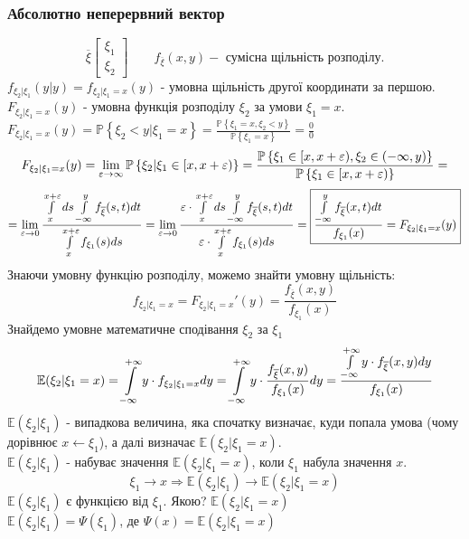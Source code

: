 \subsubsection{Абсолютно неперервний вектор}
$$
\overline{\xi}  \begin{bmatrix}
 \xi_1 \\ \xi_2
\end{bmatrix} \qquad f_{\overline{\xi}} (x,y) - \text{ сумісна щільність розподілу.}
$$
$
f_{\xi_2 | \xi_1} (y|y) = f_{\xi_2| \xi_1 = x} (y)
$ - умовна щільність другої координати за першою.\\

$F_{\xi_2 | \xi_1 = x} (y)$ - умовна функція розподілу $\xi_2$ за умови $\xi_1 = x$.\\
$ F_{\xi_2 | \xi_1 = x} (y) = \mathbb{P} \left\lbrace \xi_2 < y | \xi_1 = x  \right\rbrace = \frac{\mathbb{P} \left\lbrace \xi_1  = x , \xi_2 < y \right\rbrace}{ \mathbb{P} \left\lbrace \xi_1 = x \right\rbrace} = \frac{0}{0} $
\\$$   F_{\xi_2 | \xi_1 = x} (y) = \lim\limits_{\varepsilon \to  \infty}{
 \mathbb{P} \left\lbrace  \xi_2 | \xi_1 \in [x, x+ \varepsilon ) \right\rbrace
 } =  \frac{ \mathbb{P} \left\lbrace \xi_1 \in [x, x+ \varepsilon ) , \xi_2 \in (- \infty, y)\right\rbrace}{ \mathbb{P} \left\lbrace \xi_1 \in [x, x + \varepsilon ) \right\rbrace} =
  $$
	$$
	=  \lim\limits_{\varepsilon \to  0} { \frac{\int\limits_{x}^{ x+\varepsilon }{ ds  \int\limits_{- \infty}^{ y}{ f_{ \overline{\xi}}}(s,t)dt}}{
  \int\limits_{x}^{ x+\varepsilon }{ f_{\xi_1} (s) ds}}
  } =    \lim\limits_{\varepsilon \to  0} { \frac{\varepsilon \cdot\int\limits_{x}^{ x+\varepsilon }{ ds  \int\limits_{- \infty}^{ y}{ f_{ \overline{\xi}}}(s,t)dt}}{ \varepsilon \cdot
  \int\limits_{x}^{ x+\varepsilon }{  f_{\xi_1} (s) ds}}
  }  =  \fbox{$ \displaystyle\frac{  \int\limits_{- \infty}^{ y}{ f_{ \overline{\xi}} }(x,t)dt}{ f_{\xi_1} (x)} = F_{\xi_2 | \xi_1 = x} (y)$}
	$$
Знаючи умовну функцію розподілу, можемо знайти умовну щільність:
	$$
	f_{\xi_2 | \xi_1 = x} = F_{\xi_2| \xi_1 = x}'(y) = \frac{f_{\overline{\xi}}(x,y)}{ f_{\xi_1}(x)}
	$$
Знайдемо умовне математичне сподівання $\xi_2$ за $\xi_1$
	$$
	\mathbb{E}(\xi_2 | \xi_1 = x) =  \int\limits_{-\infty}^{ +\infty}{ y \cdot f_{\xi_2 | \xi_1 = x} dy} =  \int\limits_{-\infty}^{ +\infty}{ y \cdot \frac{f_{\overline{\xi}}(x,y)}{ f_{\xi_1} (x)}  dy} =
	\frac{
	\int\limits_{-\infty}^{ +\infty}{ y \cdot f_{\overline{\xi}}(x,y)}dy}{ f_{\xi_1} (x)}
	$$
$ \mathbb{E} (\xi_2| \xi_1)$ - випадкова величина, яка спочатку визначає, куди попала умова (чому дорівнює $x \longleftarrow \xi_1$), а далі визначає $\mathbb{E}(\xi_2| \xi_1 = x)$.\\
$\mathbb{E}(\xi_2| \xi_1)$ - набуває значення $ \mathbb{E}(\xi_2 | \xi_1 = x)$, коли $\xi_1$ набула значення $x$.
$$\xi_1 \longrightarrow x \Rightarrow \mathbb{E}(\xi_2 | \xi_1) \longrightarrow \mathbb{E}(\xi_2 | \xi_1 = x)$$
$ \mathbb{E}(\xi_2 | \xi_1)$ є функцією від $\xi_1$. Якою? $ \mathbb{E}(\xi_2 | \xi_1 = x)$\\
$ \mathbb{E} (\xi_2 | \xi_1 ) = \Psi (\xi_1)$, де $ \Psi(x) = \mathbb{E}( \xi_2 | \xi_1 = x)$
